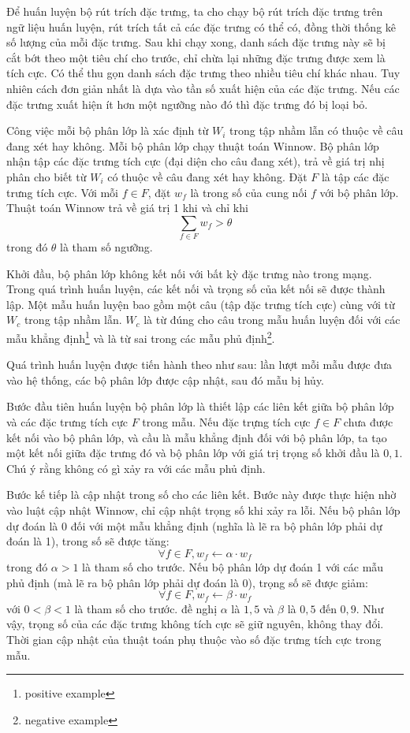 \documentclass[a4paper,oneside,14pt]{extbook} %
\begin{document}
Để huấn luyện bộ rút trích đặc trưng, ta cho chạy bộ rút trích đặc
trưng trên ngữ liệu huấn luyện, rút trích tất cả các đặc trưng có thể
có, đồng thời thống kê số lượng của mỗi đặc trưng. Sau khi chạy xong,
danh sách đặc trưng này sẽ bị cắt bớt theo một tiêu chí cho trước, chỉ
chừa lại những đặc trưng được xem là tích cực. Có thể thu gọn danh
sách đặc trưng theo nhiều tiêu chí khác nhau. Tuy nhiên cách đơn giản
nhất là dựa vào tần số xuất hiện của các đặc trưng. Nếu các đặc trưng
xuất hiện ít hơn một ngưỡng nào đó thì đặc trưng đó bị loại bỏ.

Công việc mỗi bộ phân lớp là xác định từ $W_i$ trong tập nhầm lẫn có thuộc
về câu đang xét hay không. Mỗi bộ phân lớp chạy thuật toán Winnow. Bộ
phân lớp nhận tập các đặc trưng tích cực (đại diện cho câu đang xét),
trả về giá trị nhị phân cho biết từ $W_i$ có thuộc về câu đang xét hay
không. Đặt $F$ là tập các đặc trưng tích cực. Với mỗi $f\in F$, đặt
$w_f$ là trong số của cung nối $f$ với bộ phân lớp. Thuật toán Winnow
trả về giá trị 1 khi và chỉ khi $$\sum_{f\in F}w_f > \theta$$ trong đó
$\theta$ là tham số ngưỡng. 

Khởi đầu, bộ phân lớp không kết nối với bất kỳ đặc trưng nào trong
mạng. Trong quá trình huấn luyện, các kết nối và trọng số của kết nối
sẽ được thành lập. Một mẫu huấn luyện bao gồm một câu (tập đặc trưng
tích cực) cùng với từ $W_c$ trong tập nhầm lẫn. $W_c$ là từ đúng cho
câu trong mẫu huấn luyện đối với các mẫu khẳng định\footnote{positive
  example} và là từ sai trong các mẫu phủ định\footnote{negative
  example}. 

Quá trình huấn luyện được tiến hành theo như sau: lần lượt mỗi mẫu
được đưa vào hệ thống, các bộ phân lớp được cập nhật, sau đó mẫu bị
hủy.

Bước đầu tiên huấn luyện bộ phân lớp là thiết lập các liên kết
giữa bộ phân lớp và các đặc trưng tích cực $F$ trong mẫu. Nếu đặc
trựng tích cực $f \in F$ chưa được kết nối vào bộ phân lớp, và cầu là
mẫu khẳng định đối với bộ phân lớp, ta tạo một kết nối giữa đặc trưng
đó và bộ phân lớp với giá trị trọng số khởi đầu là $0,1$. Chú ý rằng
không có gì xảy ra với các mẫu phủ định. 

Bước kế tiếp là cập nhật trong số cho các liên kết. Bước này được thực
hiện nhờ vào luật cập nhật Winnow, chỉ cập nhật trọng số khi xảy ra
lỗi. Nếu bộ phân lớp dự đoán là 0 đối với một mẫu khẳng định (nghĩa là
lẽ ra bộ phân lớp phải dự đoán là 1), trong số sẽ được tăng:
$$\forall f \in F, w_f \leftarrow \alpha \cdot w_f$$
trong đó $\alpha > 1$ là tham số cho trước. Nếu bộ phân lớp dự đoán 1
với các mẫu phủ định (mà lẽ ra bộ phân lớp phải dự đoán là 0), trọng
số sẽ được giảm:
$$\forall f \in F, w_f \leftarrow \beta \cdot w_f$$
với $0 < \beta < 1$ là tham số cho trước. \cite{Golding99} đề nghị
$\alpha$ là $1,5$ và $\beta$ là $0,5$ đến $0,9$. Như vậy, trọng số của
các đặc trưng không tích cực sẽ giữ nguyên, không thay đổi. Thời gian
cập nhật của thuật toán phụ thuộc vào số đặc trưng tích cực trong mẫu.
\end{document}
